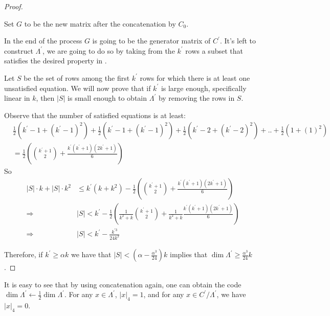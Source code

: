 \documentclass[manuscript,screen,review]{acmart}
\begin{document}
\begin{proof}
\begin{itemize}
      Set $G$ to be the new matrix after the concatenation by $C_{0}$.
  \end{itemize}

  In the end of the process $G$ is going to be the generator matrix of $C^{\prime}$. It's left to construct $\Lambda^{\prime}$, we are going to do so by taking from the $k^{\prime}$ rows a subset that satisfies the desired property in . 

Let $S$ be the set of rows among the first $k^{\prime}$ rows for which there is at least one unsatisfied equation. We will now prove that if $k^{\prime}$ is large enough, specifically linear in $k$, then $|S|$ is small enough to obtain $\Lambda^{\prime}$ by removing the rows in $S$.

Observe that the number of satisfied equations is at least:
  \begin{equation*}
    \begin{split}
      & \frac{1}{2}\left(k^{\prime}-1+(k^{\prime}-1)^{2}\right)  +\frac{1}{2}\left(k^{\prime}-1+(k^{\prime}-1)^{2}\right)  +\frac{1}{2}\left(k^{\prime}-2+(k^{\prime}-2)^{2}\right)  + .. +\frac{1}{2}\left(1+( 1 )^{2}\right) \\ 
      & = \frac{1}{2} \left(  { k^{\prime} + 1 \choose 2 }  + \frac{k^{\prime}(k^{\prime}+1)(2k^{\prime}+1)}{6} \right) 
    \end{split}
  \end{equation*}
  So 
  \begin{equation*}
    \begin{split}
      |S| \cdot k + |S|\cdot k^{2}  & \le  k^{\prime} \left( k + k^{2} \right) - \frac{1}{2} \left(  { k^{\prime} + 1 \choose 2 }  + \frac{k^{\prime}(k^{\prime}+1)(2k^{\prime}+1)}{6} \right) 
\\
\Rightarrow & |S| < k^{\prime} - \frac{1}{2}\left( \frac{1}{k^{2}+k} { k^{\prime} + 1 \choose 2 }  + \frac{1}{k^{2}+k} \frac{k^{\prime}(k^{\prime}+1)(2k^{\prime}+1)}{6} \right) \\
\Rightarrow & |S| < k^{\prime} - \frac{k^{\prime 3}}{24k^{2}} 
    \end{split}
  \end{equation*}

  Therefore, if $k^{\prime} \ge  \alpha k$ we have that $|S| < (\alpha -\frac{\alpha^{3}}{24})k$ implies that $\dim \Lambda^{\prime} \ge \frac{\alpha^{3}}{24}k$.  

\end{proof}

\begin{claim}
  It is easy to see that by using concatenation again, one can obtain the code $\dim \Lambda^{\prime} \leftarrow \frac{1}{2}\dim \Lambda^{\prime}$. For any $x \in \Lambda^{\prime}$, $|x|_{4} = 1$, and for any $x \in C^{\prime} / \Lambda^{\prime}$, we have $|x|_{4} = 0$.
  \end{claim}
\end{document}
